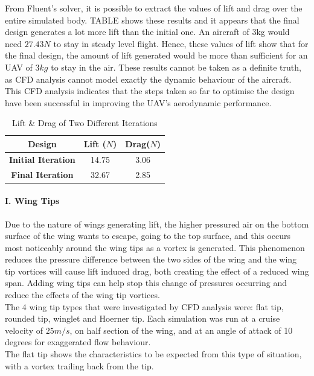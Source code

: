 \documentclass[12pt]{article}
\begin{document}
\noindent From Fluent’s solver, it is possible to extract the values of lift and drag over the entire simulated body. TABLE shows these results and it appears that the final design generates a lot more lift than the initial one. An aircraft of 3kg would need $27.43N$ to stay in steady level flight. Hence, these values of lift show that for the final design, the amount of lift generated would be more than sufficient for an UAV of $3kg$ to stay in the air. These results cannot be taken as a definite truth, as CFD analysis cannot model exactly the dynamic behaviour of the aircraft. This CFD analysis indicates that the steps taken so far to optimise the design have been successful in improving the UAV’s aerodynamic performance. \\

\begin{table}
\begin{tabular}{|c|c|c|}
\hline
\textbf{Design} & \textbf{Lift ($N$)} & \textbf{Drag($N$)} \\
\hline
\textbf{Initial Iteration} & 14.75 & 3.06 \\
\hline
\textbf{Final Iteration} & 32.67 & 2.85 \\
\hline
\end{tabular}
\caption{Lift \& Drag of Two Different Iterations}
\end{table}

\paragraph{I. Wing Tips} Due to the nature of wings generating lift, the higher pressured air on the bottom surface of the wing wants to escape, going to the top surface, and this occurs most noticeably around the wing tips as a vortex is generated. This phenomenon reduces the pressure difference between the two sides of the wing and the wing tip vortices will cause lift induced drag, both creating the effect of a reduced wing span. Adding wing tips can help stop this change of pressures occurring and reduce the effects of the wing tip vortices. \\

\noindent The 4 wing tip types that were investigated by CFD analysis were: flat tip, rounded tip, winglet and Hoerner tip. Each simulation was run at a cruise velocity of $25m/s$, on half section of the wing, and at an angle of attack of 10 degrees for exaggerated flow behaviour. \\

\noindent The flat tip shows the characteristics to be expected from this type of situation, with a vortex trailing back from the tip. \\
\end{document}
